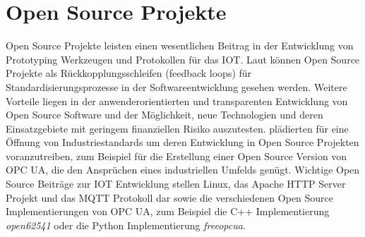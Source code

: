 \documentclass[BMR,Bachelor,ngerman]{twbook}%
\begin{document}
\section{Open Source Projekte}
Open Source Projekte leisten einen wesentlichen Beitrag in der Entwicklung von Prototyping Werkzeugen und Protokollen für das \ac{IOT}. Laut  können Open Source Projekte als Rückkopplungsschleifen (feedback loops) für Standardisierungsprozesse in der Softwareentwicklung gesehen werden. Weitere Vorteile liegen in der anwenderorientierten und transparenten Entwicklung von Open Source Software und der Möglichkeit, neue Technologien und deren Einsatzgebiete mit geringem finanziellen Risiko auszutesten.  plädierten für eine Öffnung von Industriestandards um deren Entwicklung in Open Source Projekten voranzutreiben, zum Beispiel für die Erstellung einer Open Source Version von \ac{OPC UA}, die den Ansprüchen eines industriellen Umfelds genügt. %
Wichtige Open Source Beiträge zur \ac{IOT} Entwicklung stellen Linux, das Apache HTTP Server Projekt \cite{apache} und das \ac{MQTT} Protokoll dar \cite{mqtt} sowie die verschiedenen Open Source Implementierungen von \ac{OPC UA}, zum Beispiel die C++ Implementierung \emph{open62541} \cite{open62541} oder die Python Implementierung \emph{freeopcua}.
%
%
\end{document}
